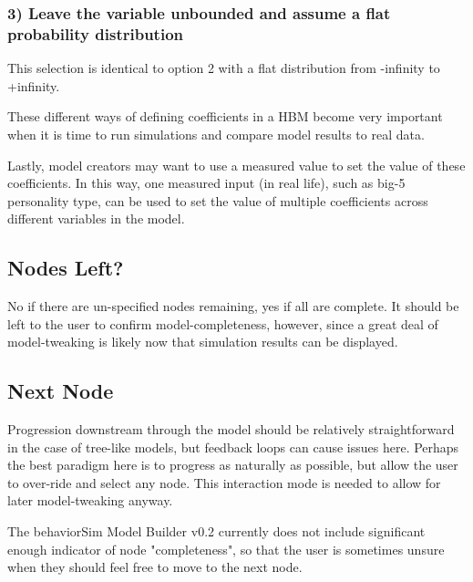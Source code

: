 \subsubsection{3) Leave the variable unbounded and assume a flat probability distribution}
This selection is identical to option 2 with a flat distribution from -infinity to +infinity.


These different ways of defining coefficients in a HBM become very important when it is time to run simulations and compare model results to real data. 

Lastly, model creators may want to use a measured value to set the value of these coefficients. In this way, one measured input (in real life), such as big-5 personality type, can be used to set the value of multiple coefficients across different variables in the model.


\subsection{Nodes Left?}
No if there are un-specified nodes remaining, yes if all are complete. 
It should be left to the user to confirm model-completeness, however, since a great deal of model-tweaking is likely now that simulation results can be displayed.

\subsection{Next Node}
Progression downstream through the model should be relatively straightforward in the case of tree-like models, but feedback loops can cause issues here. 
Perhaps the best paradigm here is to progress as naturally as possible, but allow the user to over-ride and select any node. 
This interaction mode is needed to allow for later model-tweaking anyway. 

The behaviorSim Model Builder v0.2 currently does not include significant enough indicator of node "completeness", so that the user is sometimes unsure when they should feel free to move to the next node.
